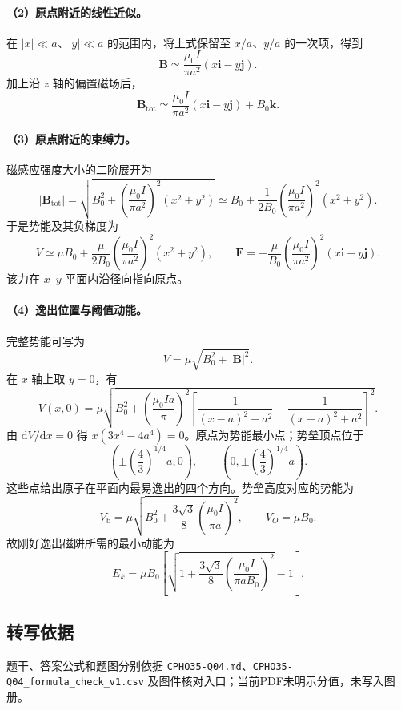 \paragraph{（2）原点附近的线性近似。} 在 $|x|\ll a$、$|y|\ll a$ 的范围内，将上式保留至 $x/a$、$y/a$ 的一次项，得到
\[
\boxed{\boldsymbol B\simeq\frac{\mu_0I}{\pi a^2}\left(x\boldsymbol i-y\boldsymbol j\right).}
\]
加上沿 $z$ 轴的偏置磁场后，
\[
\boldsymbol B_{\mathrm{tot}}\simeq\frac{\mu_0I}{\pi a^2}\left(x\boldsymbol i-y\boldsymbol j\right)+B_0\boldsymbol k.
\]

\paragraph{（3）原点附近的束缚力。} 磁感应强度大小的二阶展开为
\[
\lvert\boldsymbol B_{\mathrm{tot}}\rvert
=\sqrt{B_0^2+\left(\frac{\mu_0I}{\pi a^2}\right)^2(x^2+y^2)}
\simeq B_0+\frac{1}{2B_0}\left(\frac{\mu_0I}{\pi a^2}\right)^2(x^2+y^2).
\]
于是势能及其负梯度为
\[
V\simeq\mu B_0+\frac{\mu}{2B_0}\left(\frac{\mu_0I}{\pi a^2}\right)^2(x^2+y^2),
\qquad
\boxed{\boldsymbol F=-\frac{\mu}{B_0}\left(\frac{\mu_0I}{\pi a^2}\right)^2(x\boldsymbol i+y\boldsymbol j).}
\]
该力在 $x$--$y$ 平面内沿径向指向原点。

\paragraph{（4）逸出位置与阈值动能。} 完整势能可写为
\[
V=\mu\sqrt{B_0^2+\lvert\boldsymbol B\rvert^2}.
\]
在 $x$ 轴上取 $y=0$，有
\[
V(x,0)=\mu\sqrt{B_0^2+\left(\frac{\mu_0Ia}{\pi}\right)^2
\left[\frac{1}{(x-a)^2+a^2}-\frac{1}{(x+a)^2+a^2}\right]^2}.
\]
由 $\mathrm dV/\mathrm dx=0$ 得 $x(3x^4-4a^4)=0$。原点为势能最小点；势垒顶点位于
\[
\boxed{\left(\pm\left(\frac43\right)^{1/4}a,0\right),\qquad
\left(0,\pm\left(\frac43\right)^{1/4}a\right).}
\]
这些点给出原子在平面内最易逸出的四个方向。势垒高度对应的势能为
\[
V_{\mathrm b}=\mu\sqrt{B_0^2+\frac{3\sqrt3}{8}\left(\frac{\mu_0I}{\pi a}\right)^2},
\qquad V_O=\mu B_0.
\]
故刚好逸出磁阱所需的最小动能为
\[
\boxed{E_k=\mu B_0\left[\sqrt{1+\frac{3\sqrt3}{8}\left(\frac{\mu_0I}{\pi aB_0}\right)^2}-1\right].}
\]

\subsection{转写依据}
题干、答案公式和题图分别依据 \texttt{CPHO35-Q04.md}、\texttt{CPHO35-Q04\_formula\_check\_v1.csv} 及图件核对入口；当前PDF未明示分值，未写入图册。
